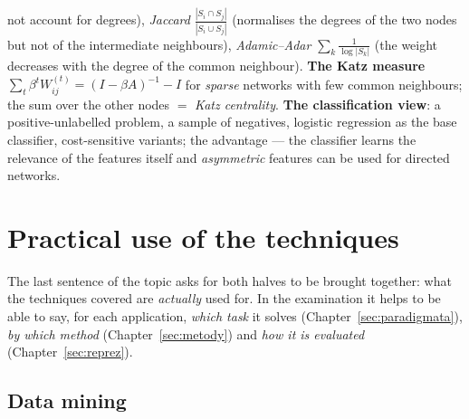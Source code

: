\documentclass[11pt,a4paper]{article}
\theoremstyle{definition}
\begin{document}
\begin{itemize}
      not account for degrees), \emph{Jaccard} $\frac{|S_i\cap S_j|}{|S_i\cup S_j|}$ (normalises the
      degrees of the two nodes but not of the intermediate neighbours), \emph{Adamic--Adar}
      $\sum_{k}\frac{1}{\log|S_k|}$ (the weight decreases with the degree of the common neighbour).
      \textbf{The Katz measure} $\sum_t\beta^tW_{ij}^{(t)}=(I-\beta A)^{-1}-I$ for \emph{sparse}
      networks with few common neighbours; the sum over the other nodes $=$ \emph{Katz centrality}.
      \textbf{The classification view}: a positive-unlabelled problem, a sample of negatives, logistic
      regression as the base classifier, cost-sensitive variants; the advantage --- the classifier
      learns the relevance of the features itself and \emph{asymmetric} features can be used for
      directed networks.
\end{itemize}

\newpage
\section{Practical use of the techniques}
\label{sec:praxe}

The last sentence of the topic asks for both halves to be brought together: what the techniques
covered are \emph{actually} used for. In the examination it helps to be able to say, for each
application, \emph{which task} it solves (Chapter~\ref{sec:paradigmata}), \emph{by which method}
(Chapter~\ref{sec:metody}) and \emph{how it is evaluated} (Chapter~\ref{sec:reprez}).

\subsection{Data mining}
\end{document}
